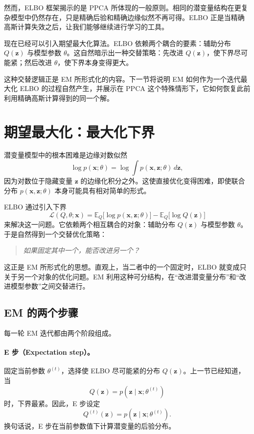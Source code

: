 然而，ELBO 框架揭示的是 PPCA 所体现的一般原则。相同的潜变量结构在更复杂模型中仍然存在，只是精确后验和精确边缘似然不再可得。ELBO 正是当精确高斯计算失效之后，让我们能够继续进行学习的工具。

\bigskip

现在已经可以引入期望最大化算法。ELBO 依赖两个耦合的要素：辅助分布 \(Q(\mathbf{z})\) 与模型参数 \(\theta\)。这自然暗示出一种交替策略：先改进 \(Q(\mathbf{z})\)，使下界尽可能紧；然后改进 \(\theta\)，使下界本身变得更大。

这种交替逻辑正是 EM 所形式化的内容。下一节将说明 EM 如何作为一个迭代最大化 ELBO 的过程自然产生，并展示在 PPCA 这个特殊情形下，它如何恢复此前利用精确高斯计算得到的同一个解。

\section{期望最大化：最大化下界}

潜变量模型中的根本困难是边缘对数似然
\[
\log p(\mathbf{x};\theta)
=
\log\int p(\mathbf{x},\mathbf{z};\theta)\,d\mathbf{z},
\]
因为对数位于隐藏变量 \(\mathbf{z}\) 的边缘化积分之外。这使直接优化变得困难，即使联合分布 \(p(\mathbf{x},\mathbf{z};\theta)\) 本身可能具有相对简单的形式。

ELBO 通过引入下界
\[
\mathcal{L}(Q,\theta;\mathbf{x})
=
\mathbb{E}_{Q}\big[\log p(\mathbf{x},\mathbf{z};\theta)\big]
-
\mathbb{E}_{Q}\big[\log Q(\mathbf{z})\big]
\]
来解决这一问题。它依赖两个相互耦合的对象：辅助分布 \(Q(\mathbf{z})\) 与模型参数 \(\theta\)。于是自然得到一个交替优化策略：
\begin{quote}
\emph{如果固定其中一个，能否改进另一个？}
\end{quote}
这正是 EM 所形式化的思想。直观上，当二者中的一个固定时，ELBO 就变成只关于另一个对象的优化问题。EM 利用这种可分结构，在“改进潜变量分布”和“改进模型参数”之间交替进行。

\subsection{EM 的两个步骤}

每一轮 EM 迭代都由两个阶段组成。

\paragraph{E 步（Expectation step）。}
固定当前参数 \(\theta^{(t)}\)，选择使 ELBO 尽可能紧的分布 \(Q(\mathbf{z})\)。上一节已经知道，当
\[
Q(\mathbf{z})=p(\mathbf{z}\mid\mathbf{x};\theta^{(t)})
\]
时，下界最紧。因此，E 步设定
\[
Q^{(t)}(\mathbf{z})
=
p(\mathbf{z}\mid\mathbf{x};\theta^{(t)}).
\]
换句话说，E 步在当前参数值下计算潜变量的后验分布。

